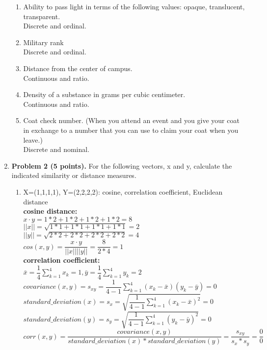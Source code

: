 \documentclass{article}%
\begin{document}
\begin{enumerate}
\begin{enumerate}
		\item Ability to pass light in terms of the following values: opaque, translucent, transparent. \\
		Discrete and ordinal.
		
		\item Military rank\\
		Discrete and ordinal.		
		
		\item Distance from the center of campus. \\
		Continuous and ratio.	
		
		\item Density of a substance in grams per cubic centimeter. \\
		Continuous and ratio.
		
		\item Coat check number. (When you attend an event and you give your coat in exchange to a number that you can use to claim your coat when you leave.) \\
		Discrete and nominal.
	\end{enumerate}
  
 \item \textbf{Problem 2 (5 points).} For the following vectors, x and y, calculate the indicated similarity or distance measures.
 \begin{enumerate}
		\item X=(1,1,1,1), Y=(2,2,2,2): cosine, correlation coefficient, Euclidean distance \\
		\textbf{cosine distance:} \\
		$ x \cdot  y = 1*2 + 1*2 + 1*2 + 1*2  = 8$ \\
		$ ||x|| = \sqrt{1*1 + 1*1 + 1*1 + 1*1} = 2 $ \\
		$ ||y|| = \sqrt{2*2 + 2*2 + 2*2 + 2*2} = 4 $ \\
		$ cos(x,y) = \dfrac{x \cdot y }{ ||x|| ||y||} = \dfrac{8}{2*4} = 1 $\\
		
		\textbf{correlation coefficient: }\\
		$ \bar{x} = \dfrac{1}{4} \sum_{k=1}^4x_k=1, \bar{y} = \dfrac{1}{4} \sum_{k=1}^4y_k = 2 $ \\
		$ covariance(x,y) = s_{xy} = \dfrac{1}{4 - 1} \sum_{k=1}^{4}(x_k - \bar{x})(y_k-\bar{y}) = 0$	\\
		$ standard\_deviation(x) = s_{x} = \sqrt{\dfrac{1}{4-1}\sum_{k=1}^{4}(x_k - \bar{x})^2} = 0$	\\		
		$ standard\_deviation(y) = s_{y} = \sqrt{\dfrac{1}{4-1}\sum_{k=1}^{4}(y_k - \bar{y})^2} = 0$	\\		
		$ corr(x,y) = \dfrac{covariance(x,y)}{standard\_deviation(x)*standard\_deviation(y)} = \dfrac{s_{xy}}{s_x*s_y} = \dfrac{0}{0}$	 \\
		

\end{enumerate}
\end{enumerate}
\end{document}
